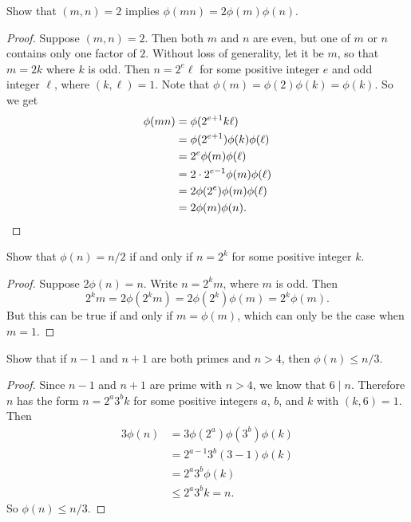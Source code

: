  Show that $(m,n) = 2$ implies $\phi(mn) = 2\phi(m)\phi(n)$.
\begin{proof}
  Suppose $(m,n) = 2$. Then both $m$ and $n$ are even, but one of $m$
  or $n$ contains only one factor of $2$. Without loss of generality,
  let it be $m$, so that $m = 2k$ where $k$ is odd. Then $n = 2^e\ell$
  for some positive integer $e$ and odd integer $\ell$, where
  $(k,\ell) = 1$. Note that $\phi(m) = \phi(2)\phi(k) = \phi(k)$. So
  we get
  \begin{align*}
    \phi(mn) &= \phi(2^{e+1}k\ell) \\
             &= \phi(2^{e+1})\phi(k)\phi(\ell) \\
             &= 2^e\phi(m)\phi(\ell) \\
             &= 2\cdot2^{e-1}\phi(m)\phi(\ell) \\
             &= 2\phi(2^e)\phi(m)\phi(\ell) \\
             &= 2\phi(m)\phi(n). \qedhere
  \end{align*}
\end{proof}

 Show that $\phi(n) = n/2$ if and only if $n = 2^k$ for
some positive integer $k$.
\begin{proof}
  Suppose $2\phi(n) = n$. Write $n = 2^km$, where $m$ is
  odd. Then
  \begin{equation*}
    2^km = 2\phi(2^km) = 2\phi(2^k)\phi(m) = 2^k\phi(m).
  \end{equation*}
  But this can be true if and only if $m = \phi(m)$, which can only be
  the case when $m = 1$.
\end{proof}

 Show that if $n - 1$ and $n + 1$ are both primes and
$n > 4$, then $\phi(n) \leq n/3$.
\begin{proof}
  Since $n - 1$ and $n + 1$ are prime with $n > 4$, we know that
  $6\mid n$. Therefore $n$ has the form $n = 2^a3^bk$ for some
  positive integers $a$, $b$, and $k$ with $(k,6) = 1$. Then
  \begin{align*}
    3\phi(n) &= 3\phi(2^a)\phi(3^b)\phi(k) \\
             &= 2^{a-1}3^b(3 - 1)\phi(k) \\
             &= 2^a3^b\phi(k) \\
             &\leq 2^a3^bk = n.
  \end{align*}
  So $\phi(n) \leq n/3$.
\end{proof}

